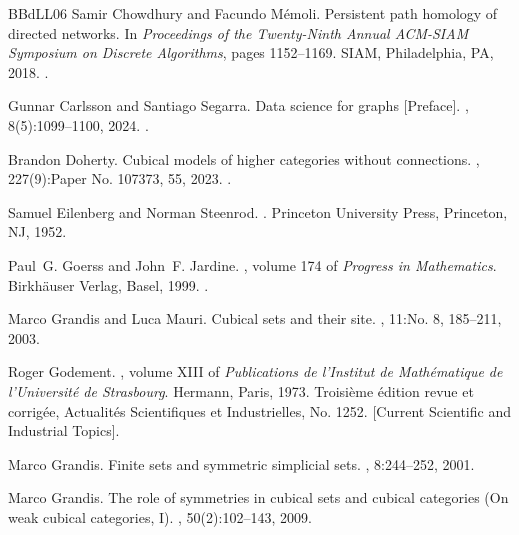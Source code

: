 \documentclass[12pt]{amsart}
\theoremstyle{plain}
\numberwithin{lemma}{\DefaultNumberTheoremWithin}
\numberwithin{claim}{\DefaultNumberTheoremWithin}
\numberwithin{theorem}{\DefaultNumberTheoremWithin}
\numberwithin{corollary}{\DefaultNumberTheoremWithin}
\numberwithin{proposition}{\DefaultNumberTheoremWithin}
\numberwithin{conjecture}{\DefaultNumberTheoremWithin}
\theoremstyle{definition}
\theoremstyle{definition}
\numberwithin{question}{\DefaultNumberTheoremWithin}
\theoremstyle{definition}
\numberwithin{problem}{\DefaultNumberTheoremWithin}
\theoremstyle{remark}
\numberwithin{remark}{\DefaultNumberTheoremWithin}
\theoremstyle{remark}
\numberwithin{example}{\DefaultNumberTheoremWithin}
\begin{document}
\begin{thebibliography}{BBdLL06}
Samir Chowdhury and Facundo M\'emoli.
\newblock Persistent path homology of directed networks.
\newblock In {\em Proceedings of the {T}wenty-{N}inth {A}nnual {ACM}-{SIAM}
  {S}ymposium on {D}iscrete {A}lgorithms}, pages 1152--1169. SIAM,
  Philadelphia, PA, 2018.
\newblock \href {https://doi.org/10.1137/1.9781611975031.75}
  {}.

Gunnar Carlsson and Santiago Segarra.
\newblock Data science for graphs [{P}reface].
, 8(5):1099--1100, 2024.
\newblock \href {https://doi.org/10.1007/s41468-024-00186-5}
  {}.

Brandon Doherty.
\newblock Cubical models of higher categories without connections.
, 227(9):Paper No. 107373, 55, 2023.
\newblock \href {https://doi.org/10.1016/j.jpaa.2023.107373}
  {}.

Samuel Eilenberg and Norman Steenrod.
.
\newblock Princeton University Press, Princeton, NJ, 1952.

Paul~G. Goerss and John~F. Jardine.
, volume 174 of {\em Progress in
  Mathematics}.
\newblock Birkh\"auser Verlag, Basel, 1999.
\newblock \href {https://doi.org/10.1007/978-3-0348-8707-6}
  {}.

Marco Grandis and Luca Mauri.
\newblock Cubical sets and their site.
, 11:No. 8, 185--211, 2003.

Roger Godement.
, volume XIII
  of {\em Publications de l'Institut de Math\'ematique de l'Universit\'e{} de
  Strasbourg}.
\newblock Hermann, Paris, 1973.
\newblock Troisi\`eme \'edition revue et corrig\'ee, Actualit\'es Scientifiques
  et Industrielles, No. 1252. [Current Scientific and Industrial Topics].

Marco Grandis.
\newblock Finite sets and symmetric simplicial sets.
, 8:244--252, 2001.

Marco Grandis.
\newblock The role of symmetries in cubical sets and cubical categories ({O}n
  weak cubical categories, {I}).
, 50(2):102--143, 2009.


\end{thebibliography}
\end{document}

